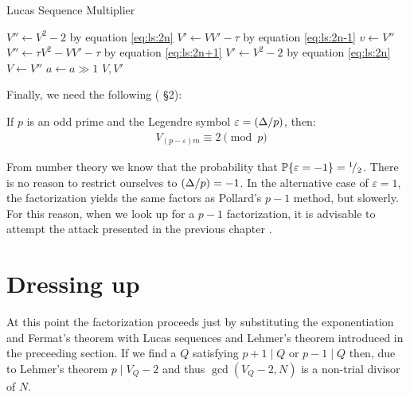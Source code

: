 \begin{algorithm}[H]
  \caption{Lucas Sequence Multiplier}
  \begin{algorithmic}[1]
          \State $V'' \gets V^2 -2$
          \Comment by equation \ref{eq:ls:2n}
          \State $V' \gets VV' - \tau$
          \Comment by equation \ref{eq:ls:2n-1}
          \State $v \gets V''$
          \State $V'' \gets \tau V^2 - VV' - \tau$
          \Comment by equation \ref{eq:ls:2n+1}
          \State $V' \gets V^2 -2$
          \Comment by equation \ref{eq:ls:2n}
          \State $V \gets V''$
        \EndIf
        \State $a \gets a \gg 1$
      \EndWhile
      \State \Return $V, V'$
    \EndFunction
  \end{algorithmic}
\end{algorithm}

Finally, we need the following (\cite{Williams:p+1} \S 2):
\begin{theorem*}[Lehmer]
  If $p$ is an odd prime and the Legendre symbol
  $\varepsilon = ({\Delta}/{p})$, then:
  \begin{align*}
  &  V_{(p - \varepsilon)m} \equiv 2 \pmod{p}
  \end{align*}
\end{theorem*}



\begin{remark}
  From number theory we know that the probability that
  $\mathbb{P}\{\varepsilon = -1\} = {}^{1}\!/_{2}$.
  There is no reason to restrict ourselves to
  $({\Delta}/{p}) = -1$.
  In the alternative case of $\varepsilon = 1$, the factorization yields the
  same factors as Pollard's $p-1$ method, but slowerly.
  For this reason, when we look up for a $p-1$ factorization, it is advisable
  to attempt the attack presented in the previous chapter \cite{Williams:p+1}.
\end{remark}


\section{Dressing up}

At this point the factorization proceeds just by substituting the
exponentiation and Fermat's theorem with Lucas sequences and Lehmer's theorem
introduced in the preceeding section. If we find a $Q$ satisfying $p+1 \mid Q
\text{ or } p-1 \mid Q$ then, due to Lehmer's theorem $p \mid V_Q -2$ and thus
$\gcd(V_Q -2, N)$ is a non-trial divisor of $N$.

